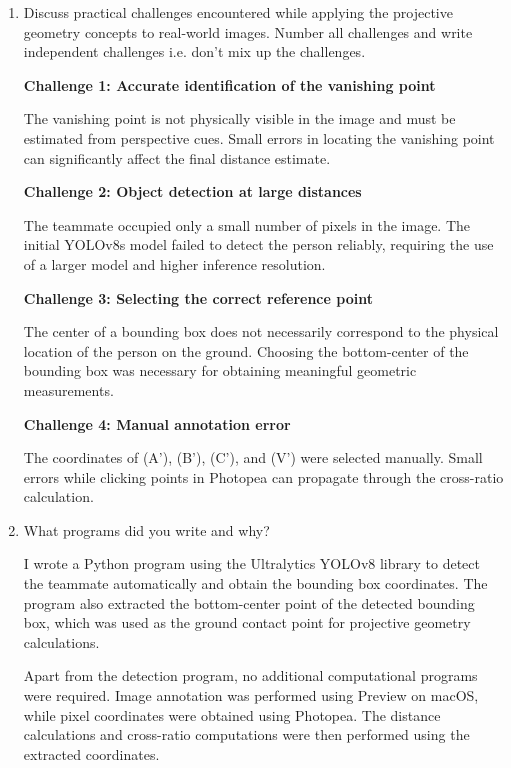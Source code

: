 \begin{enumerate}
  
\item Discuss practical challenges encountered while applying the projective
geometry concepts to real-world images. Number all challenges and write independent challenges i.e. don't mix up the challenges.
\begin{studentSpace}
    \textbf{Challenge 1: Accurate identification of the vanishing point}

The vanishing point is not physically visible in the image and must be estimated from perspective cues. Small errors in locating the vanishing point can significantly affect the final distance estimate.

\textbf{Challenge 2: Object detection at large distances}

The teammate occupied only a small number of pixels in the image. The initial YOLOv8s model failed to detect the person reliably, requiring the use of a larger model and higher inference resolution.

\textbf{Challenge 3: Selecting the correct reference point}

The center of a bounding box does not necessarily correspond to the physical location of the person on the ground. Choosing the bottom-center of the bounding box was necessary for obtaining meaningful geometric measurements.

\textbf{Challenge 4: Manual annotation error}

The coordinates of (A'), (B'), (C'), and (V') were selected manually. Small errors while clicking points in Photopea can propagate through the cross-ratio calculation.
\end{studentSpace}


\item What programs did you write and why?  
\begin{studentSpace}
    I wrote a Python program using the Ultralytics YOLOv8 library to detect the teammate automatically and obtain the bounding box coordinates. The program also extracted the bottom-center point of the detected bounding box, which was used as the ground contact point for projective geometry calculations.

Apart from the detection program, no additional computational programs were required. Image annotation was performed using Preview on macOS, while pixel coordinates were obtained using Photopea. The distance calculations and cross-ratio computations were then performed using the extracted coordinates.
\end{studentSpace}


\end{enumerate}

